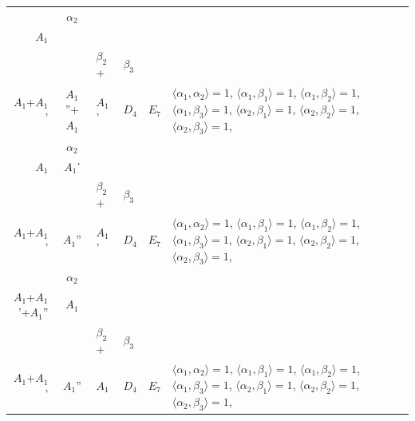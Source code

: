 \documentclass[12pt]{report}
\begin{document}
\begin{appendix}
{\begin{longtable}{rcl p{1cm}p{1cm}p{3cm} }
\\
\begin{tabular}{cc}$\alpha_1$+ & $\alpha_2$\\\tiny{ $A_1$ } & \tiny{  }\end{tabular} &\begin{tabular}{c} = \\~ \end{tabular} & \begin{tabular}{ccc}$\beta_1$+ & $\beta_2$+ & $\beta_3$\\\tiny{ $A_1$+$A_1$' } & \tiny{ $A_1$''+$A_1$ } & \tiny{ $A_1$' }\end{tabular} & $D_4$ & $E_7$ & $\langle\alpha_1, \alpha_2\rangle=1$,  $\langle\alpha_1, \beta_1\rangle=1$, $\langle\alpha_1, \beta_2\rangle=1$, $\langle\alpha_1, \beta_3\rangle=1$, $\langle\alpha_2, \beta_1\rangle=1$, $\langle\alpha_2, \beta_2\rangle=1$, $\langle\alpha_2, \beta_3\rangle=1$, 
\\
\begin{tabular}{cc}$\alpha_1$+ & $\alpha_2$\\\tiny{ $A_1$ } & \tiny{ $A_1$' }\end{tabular} &\begin{tabular}{c} = \\~ \end{tabular} & \begin{tabular}{ccc}$\beta_1$+ & $\beta_2$+ & $\beta_3$\\\tiny{ $A_1$+$A_1$' } & \tiny{ $A_1$'' } & \tiny{ $A_1$' }\end{tabular} & $D_4$ & $E_7$ & $\langle\alpha_1, \alpha_2\rangle=1$,  $\langle\alpha_1, \beta_1\rangle=1$, $\langle\alpha_1, \beta_2\rangle=1$, $\langle\alpha_1, \beta_3\rangle=1$, $\langle\alpha_2, \beta_1\rangle=1$, $\langle\alpha_2, \beta_2\rangle=1$, $\langle\alpha_2, \beta_3\rangle=1$, 
\\
\begin{tabular}{cc}$\alpha_1$+ & $\alpha_2$\\\tiny{ $A_1$+$A_1$'+$A_1$'' } & \tiny{ $A_1$ }\end{tabular} &\begin{tabular}{c} = \\~ \end{tabular} & \begin{tabular}{ccc}$\beta_1$+ & $\beta_2$+ & $\beta_3$\\\tiny{ $A_1$+$A_1$' } & \tiny{ $A_1$'' } & \tiny{ $A_1$ }\end{tabular} & $D_4$ & $E_7$ & $\langle\alpha_1, \alpha_2\rangle=1$,  $\langle\alpha_1, \beta_1\rangle=1$, $\langle\alpha_1, \beta_2\rangle=1$, $\langle\alpha_1, \beta_3\rangle=1$, $\langle\alpha_2, \beta_1\rangle=1$, $\langle\alpha_2, \beta_2\rangle=1$, $\langle\alpha_2, \beta_3\rangle=1$, 

\end{longtable}}
\end{appendix}
\end{document}
